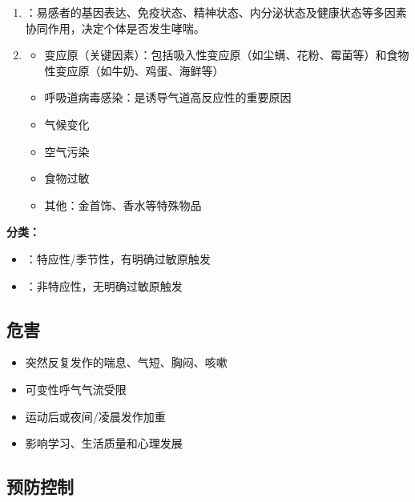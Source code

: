 \begin{keybox}
\begin{enumerate}[leftmargin=*]
    \item {}：易感者的基因表达、免疫状态、精神状态、内分泌状态及健康状态等多因素协同作用，决定个体是否发生哮喘。
    \item {}
    \begin{itemize}[leftmargin=*]
        \item 变应原（关键因素）：包括吸入性变应原（如尘螨、花粉、霉菌等）和食物性变应原（如牛奶、鸡蛋、海鲜等）
        \item 呼吸道病毒感染：是诱导气道高反应性的重要原因
        \item 气候变化
        \item 空气污染
        \item 食物过敏
        \item 其他：金首饰、香水等特殊物品
    \end{itemize}
\end{enumerate}

\textbf{分类：}
\begin{itemize}[leftmargin=*]
    \item {}：特应性/季节性，有明确过敏原触发
    \item {}：非特应性，无明确过敏原触发
\end{itemize}
\end{keybox}

\subsection{危害}

\begin{keybox}
\begin{itemize}[leftmargin=*]
    \item 突然反复发作的喘息、气短、胸闷、咳嗽
    \item 可变性呼气气流受限
    \item 运动后或夜间/凌晨发作加重
    \item 影响学习、生活质量和心理发展
\end{itemize}
\end{keybox}

\subsection{预防控制}

